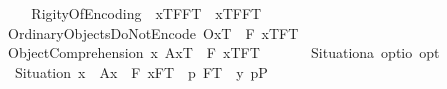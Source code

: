 \begin{isabellebody}
\begin{isamarkuptext}
\end{isamarkuptext}\isamarkuptrue%
\ \isamarkupfalse%
\ \isanewline
\ \ RigityOfEncoding{\isacharcolon}\ \ {\isachardoublequoteopen}{\isacharbrackleft}{\isasymlbrace}x\isactrlsup T{\isacharcomma}FF\isactrlsup T{\isasymrbrace}\ \isactrlbold {\isasymrightarrow}\ \isactrlbold {\isasymbox}{\isasymlbrace}x\isactrlsup T{\isacharcomma}FF\isactrlsup T{\isasymrbrace}{\isacharbrackright}\ {\isacharequal}\ {\isasymtop}{\isachardoublequoteclose}\ \isanewline
\ \ OrdinaryObjectsDoNotEncode{\isacharcolon}\ {\isachardoublequoteopen}{\isacharbrackleft}{\isasymlparr}O{\isacharbang}{\isacharcomma}x\isactrlsup T{\isasymrparr}\ \isactrlbold {\isasymrightarrow}\ \isactrlbold {\isasymbox}{\isacharparenleft}\isactrlbold {\isasymnot}{\isacharparenleft}\isactrlbold {\isasymexists}F{\isachardot}\ {\isasymlbrace}x\isactrlsup T{\isacharcomma}F\isactrlsup T{\isasymrbrace}{\isacharparenright}{\isacharparenright}{\isacharbrackright}\ {\isacharequal}\ {\isasymtop}{\isachardoublequoteclose}\ \isanewline
\ \ ObjectComprehension{\isacharcolon}\ {\isachardoublequoteopen}{\isacharbrackleft}{\isacharparenleft}\isactrlbold {\isasymexists}x{\isachardot}\ {\isasymlparr}A{\isacharbang}{\isacharcomma}x\isactrlsup T{\isasymrparr}\ \isactrlbold {\isasymand}\ {\isacharparenleft}\isactrlbold {\isasymforall}F{\isachardot}\ {\isasymlbrace}x\isactrlsup T{\isacharcomma}F\isactrlsup T{\isasymrbrace}\ \isactrlbold {\isasymequiv}\ {\isasymphi}{\isacharparenright}{\isacharparenright}{\isacharbrackright}\ {\isacharequal}\ {\isasymtop}{\isachardoublequoteclose}\isanewline
\isanewline
\ \isamarkupfalse%
\ Situation{\isacharcolon}{\isacharcolon}{\isachardoublequoteopen}{\isacharprime}a\ opt{\isasymRightarrow}io\ opt{\isachardoublequoteclose}\ \ \ \isanewline
\ \ \ {\isachardoublequoteopen}Situation\ x\ {\isasymequiv}\ {\isacharparenleft}{\isasymlparr}A{\isacharbang}{\isacharcomma}x{\isasymrparr}\ \isactrlbold {\isasymand}\ {\isacharparenleft}\isactrlbold {\isasymforall}F{\isachardot}\ {\isacharparenleft}{\isasymlbrace}x{\isacharcomma}F\isactrlsup T{\isasymrbrace}\ \isactrlbold {\isasymrightarrow}\ {\isacharparenleft}\isactrlbold {\isasymexists}p{\isachardot}\ F\isactrlsup T\ \isactrlbold {\isacharequal}\ {\isacharparenleft}\isactrlbold {\isasymlambda}y{\isachardot}\ p\isactrlsup P{\isacharparenright}{\isacharparenright}{\isacharparenright}{\isacharparenright}{\isacharparenright}{\isachardoublequoteclose}\isanewline
\ \isamarkupfalse%

\end{isabellebody}

